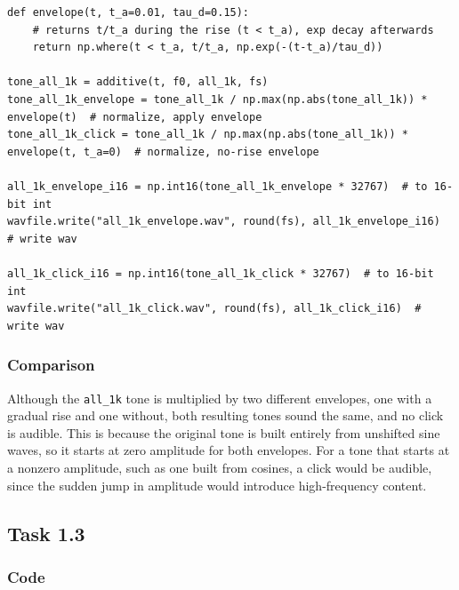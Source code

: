 \documentclass[11pt, a4paper]{article}
\begin{document}
\begin{lstlisting}[style=python]
def envelope(t, t_a=0.01, tau_d=0.15):
    # returns t/t_a during the rise (t < t_a), exp decay afterwards
    return np.where(t < t_a, t/t_a, np.exp(-(t-t_a)/tau_d))

tone_all_1k = additive(t, f0, all_1k, fs)
tone_all_1k_envelope = tone_all_1k / np.max(np.abs(tone_all_1k)) * envelope(t)  # normalize, apply envelope
tone_all_1k_click = tone_all_1k / np.max(np.abs(tone_all_1k)) * envelope(t, t_a=0)  # normalize, no-rise envelope

all_1k_envelope_i16 = np.int16(tone_all_1k_envelope * 32767)  # to 16-bit int
wavfile.write("all_1k_envelope.wav", round(fs), all_1k_envelope_i16)  # write wav

all_1k_click_i16 = np.int16(tone_all_1k_click * 32767)  # to 16-bit int
wavfile.write("all_1k_click.wav", round(fs), all_1k_click_i16)  # write wav
\end{lstlisting}

\subsubsection*{Comparison}
Although the \texttt{all\_1k} tone is multiplied by two different envelopes, one with a gradual rise and one without, both resulting tones sound the same, and no click is audible. This is because the original tone is built entirely from unshifted sine waves, so it starts at zero amplitude for both envelopes. For a tone that starts at a nonzero amplitude, such as one built from cosines, a click would be audible, since the sudden jump in amplitude would introduce high-frequency content.

\subsection*{Task 1.3}

\subsubsection*{Code}
\end{document}
